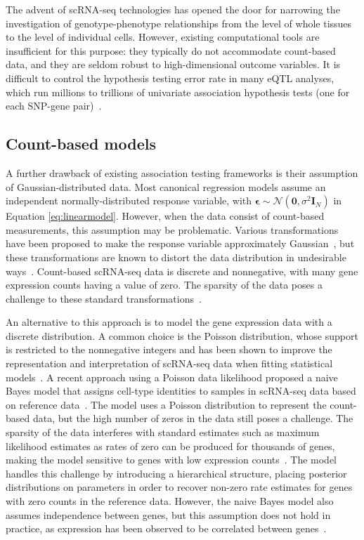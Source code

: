 \documentclass{bmcart}
\begin{document}
The advent of scRNA-seq technologies has opened the door for narrowing the investigation of genotype-phenotype relationships from the level of whole tissues to the level of individual cells. However, existing computational tools are insufficient for this purpose: they typically do not accommodate count-based data, and they are seldom robust to high-dimensional outcome variables. It is difficult to control the hypothesis testing error rate in many eQTL analyses, which run millions to trillions of univariate association hypothesis tests (one for each SNP-gene pair)~\citep{GWASstatmethods,gtex2020gtex,aguet2017genetic,karczewski2021systematic,willer2013discovery}.

\subsection*{Count-based models}
A further drawback of existing association testing frameworks is their assumption of Gaussian-distributed data. Most canonical regression models assume an independent normally-distributed response variable, with $\boldsymbol{\epsilon} \sim \mathcal{N}(\mathbf{0}, \sigma^2 \mathbf{I}_N)$ in Equation \eqref{eq:linearmodel}. However, when the data consist of count-based measurements, this assumption may be problematic. Various transformations have been proposed to make the response variable approximately Gaussian~\citep{butler2018integrating,yu2009variance},
but these transformations are known to distort the data distribution in undesirable ways~\citep{townes_feature_2019,booeshaghi2021normalization,hafemeister2019normalization}.
Count-based scRNA-seq data is discrete and nonnegative, with many gene expression counts having a value of zero. The sparsity of the data poses a challenge to these standard transformations~\citep{townes_feature_2019}.

An alternative to this approach is to model the gene expression data with a discrete distribution. A common choice is the Poisson distribution, whose support is restricted to the nonnegative integers and has been shown to improve the representation and interpretation of scRNA-seq data when fitting statistical models~\citep{townes_feature_2019,jones2021contrastive}. A recent approach using a Poisson data likelihood proposed a naive Bayes model that assigns cell-type identities to samples in scRNA-seq data based on reference data~\citep{Grabski2020.01.05.895441}. The model uses a Poisson distribution to represent the count-based data, but the high number of zeros in the data still poses a challenge. The sparsity of the data interferes with standard estimates such as maximum likelihood estimates as rates of zero can be produced for thousands of genes, making the model sensitive to genes with low expression counts~\citep{Grabski2020.01.05.895441}. The model handles this challenge by introducing a hierarchical structure, placing posterior distributions on parameters in order to recover non-zero rate estimates for genes with zero counts in the reference data. However, the naive Bayes model also assumes independence between genes, but this assumption does not hold in practice, as expression has been observed to be correlated between genes~\citep{satija,townes_feature_2019,van2018gene}.
\end{document}
